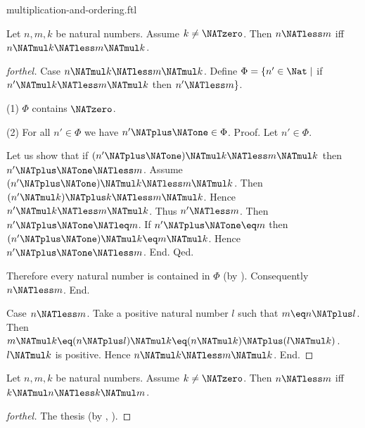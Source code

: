 \documentclass{naproche-library}
\begin{document}
\begin{smodule}[title=Multiplication and Ordering]{multiplication-and-ordering.ftl}

\begin{proposition}[forthel,id=ARITHMETIC_06_8817333933965312]
  Let $n, m, k$ be natural numbers.
  Assume $k \neq \NATzero$.
  Then $n \NATless m$ iff $n \NATmul k \NATless m \NATmul k$.
\end{proposition}
\begin{proof}[forthel]
  Case $n \NATmul k \NATless m \NATmul k$.
    Define $\Phi = \{ n' \in \Nat \mid$ if $n' \NATmul k \NATless m \NATmul k$ then $n' \NATless m \}$.

    (1) $\Phi$ contains $\NATzero$.

    (2) For all $n' \in \Phi$ we have $n' \NATplus \NATone \in \Phi$. \newline
    Proof.
      Let $n' \in \Phi$.

      Let us show that if $(n' \NATplus \NATone) \NATmul k \NATless m \NATmul k$ then $n' \NATplus \NATone \NATless m$.
        Assume $(n' \NATplus \NATone) \NATmul k \NATless m \NATmul k$.
        Then $(n' \NATmul k) \NATplus k \NATless m \NATmul k$.
        Hence $n' \NATmul k \NATless m \NATmul k$.
        Thus $n' \NATless m$.
        Then $n' \NATplus \NATone \NATleq m$.
        If $n' \NATplus \NATone \eq m$ then $(n' \NATplus \NATone) \NATmul k \eq m \NATmul k$.
        Hence $n' \NATplus \NATone \NATless m$.
      End.
    Qed.

    Therefore every natural number is contained in $\Phi$ (by ).
    Consequently $n \NATless m$.
  End.

  Case $n \NATless m$.
    Take a positive natural number $l$ such that $m \eq n \NATplus l$.
    Then $m \NATmul k \eq (n \NATplus l) \NATmul k \eq (n \NATmul k) \NATplus (l \NATmul k)$.
    $l \NATmul k$ is positive.
    Hence $n \NATmul k \NATless m \NATmul k$.
  End.
\end{proof}

\begin{corollary}[forthel,id=ARITHMETIC_06_5048640368279552]
  Let $n, m, k$ be natural numbers.
  Assume $k \neq \NATzero$.
  Then $n \NATless m$ iff $k \NATmul n \NATless k \NATmul m$.
\end{corollary}
\begin{proof}[forthel]
  The thesis (by , ).
\end{proof}


\end{smodule}
\end{document}

